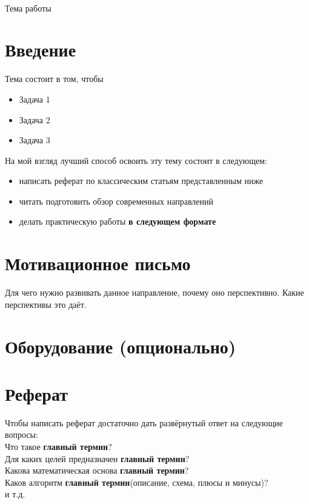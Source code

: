 \documentclass[a4paper,12pt]{article}
\begin{document}
{~}\bigskip
\begin{center}
\Huge{Тема работы}
\end{center}

\section{Введение}

Тема состоит в том, чтобы 
\begin{itemize}
	\item Задача 1
	\item Задача 2
	\item Задача 3
\end{itemize}

На мой взгляд лучший способ освоить эту тему состоит в следующем:
\begin{itemize}
	\item написать реферат по классическим статьям представленным ниже
	\item читать подготовить обзор современных направлений
	\item делать практическую работы \textbf{в следующем формате}
\end{itemize}

\section{Мотивационное письмо}

Для чего нужно развивать данное направление, почему оно перспективно. Какие перспективы это даёт.

\section{Оборудование (опционально)}



\section{Реферат}

Чтобы написать реферат достаточно дать развёрнутый ответ на следующие вопросы:\\
Что такое \textbf{главный термин}?\\
Для каких целей предназначен \textbf{главный термин}?\\
Какова математическая основа \textbf{главный термин}?\\
Каков алгоритм \textbf{главный термин}(описание, схема, плюсы и минусы)?\\
и т.д.\\
\end{document}

